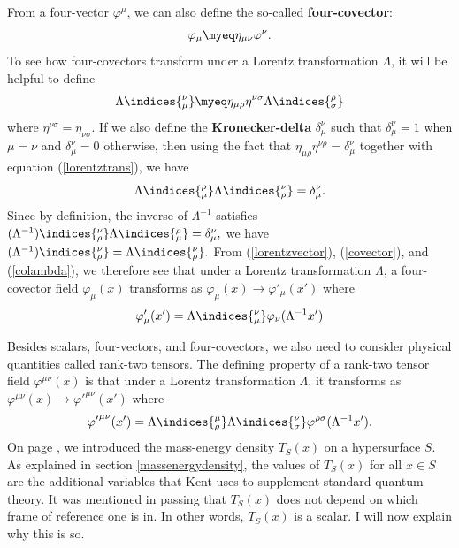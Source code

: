 \documentclass[12pt]{report}
\begin{document}
From a four-vector $\varphi^\mu$, we can also define the so-called \textbf{four-covector}: 
\begin{equation}\label{covector}
	\varphi_\mu\myeq\eta_{\mu\nu}\varphi^\nu.
\end{equation}
To see how four-covectors transform under a Lorentz transformation $\Lambda$, it will be helpful to define 
\begin{equation}\label{colambda}
	\Lambda\indices{_\mu^\nu}\myeq\eta_{\mu\rho}\eta^{\nu\sigma}\Lambda\indices{^\rho_\sigma}
\end{equation}
where %
%
 $\eta^{\nu\sigma}=\eta_{\nu\sigma}$. %
 If we also define the \textbf{Kronecker-delta} $\delta^\nu_\mu$ such%
%
that $\delta^\nu_\mu=1$ when $\mu=\nu$ and $\delta^\nu_\mu=0$ otherwise, then using the fact that $\eta_{\mu\rho}\eta^{\nu\rho}=\delta^\nu_\mu$ together with equation (\ref{lorentztrans}), we have 
\begin{equation}\label{lambdainverse}
\Lambda\indices{^\rho_\mu}\Lambda\indices{_\rho^\nu}=\delta^\nu_\mu.
\end{equation}
Since by definition, the inverse of $\Lambda^{-1}$ satisfies 
$(\Lambda^{-1})\indices{^\nu_\rho}\Lambda\indices{^\rho_\mu}=\delta^\nu_\mu,$
 we have $(\Lambda^{-1})\indices{^\nu_\rho}=\Lambda\indices{_\rho^\nu}.$  From (\ref{lorentzvector}), (\ref{covector}), and (\ref{colambda}), we therefore see that under a Lorentz transformation $\Lambda$, a four-covector field $\varphi_\mu(x)$ transforms as $\varphi_\mu(x)\rightarrow\varphi'_\mu(x')$
where
\begin{equation}\label{lorentzcovector}
\varphi'_\mu(x')=\Lambda\indices{_\mu^\nu}\varphi_\nu(\Lambda^{-1}x')
\end{equation}
 

Besides scalars, four-vectors, and four-covectors, we also need to consider physical quantities called rank-two tensors. The defining property of a rank-two tensor field $\varphi^{\mu\nu}(x)$ is that under a Lorentz transformation $\Lambda$, it transforms as $\varphi^{\mu\nu}(x)\rightarrow{\varphi'}^{\mu\nu}(x')$ where
\begin{equation}\label{lorentztensor}
{\varphi'}^{\mu\nu}(x')=\Lambda\indices{^\mu_\rho}\Lambda\indices{^\nu_\sigma}\varphi^{\rho\sigma}(\Lambda^{-1}x').
\end{equation}
On page \pageref{massenergydensity}, we introduced the mass-energy density $T_S(x)$ on a hypersurface $S$. As explained in section \ref{massenergydensity}, the values of $T_S(x)$ for all $x\in S$ are the additional variables that Kent uses to supplement standard quantum theory.  It was mentioned in passing that $T_S(x)$ does not depend on which frame of reference one is in. In other words, $T_S(x)$ is a scalar. I will now explain why this is so. 
\end{document}
